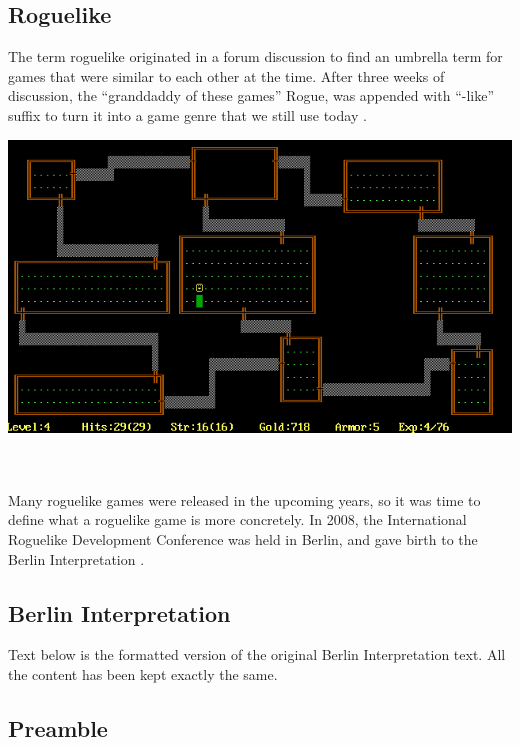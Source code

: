\documentclass{article}
\begin{document}
\subsection{Roguelike}
The term roguelike originated in a forum discussion to find an umbrella term for games that were similar to each other at the time. After three weeks of discussion, the “granddaddy of these games” Rogue, was appended with “-like” suffix to turn it into a game genre that we still use today \cite{roguelike-term}.\\ 

\begin{minipage}{\linewidth}
    \centering
    \includegraphics[width=1\textwidth]{rogue.png}
\end{minipage}\\\\

Many roguelike games were released in the upcoming years, so it was time to define what a roguelike game is more concretely. In 2008, the International Roguelike Development Conference was held in Berlin, and gave birth to the Berlin Interpretation \cite{berlin}.\\

\subsection{Berlin Interpretation}\label{berlin}

Text below is the formatted version of the original Berlin Interpretation text. All the content has been kept exactly the same.

\subsection*{Preamble}
\end{document}
